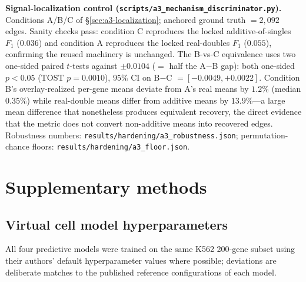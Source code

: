 \documentclass{article}
\theoremstyle{plain}
\theoremstyle{definition}
\theoremstyle{remark}
\begin{document}
\textbf{Signal-localization control (\texttt{scripts/a3\_mechanism\_discriminator.py}).} Conditions A/B/C of \S\ref{sec:a3-localization}; anchored ground truth $= 2{,}092$ edges. Sanity checks pass: condition C reproduces the locked additive-of-singles $F_1$ ($0.036$) and condition A reproduces the locked real-doubles $F_1$ ($0.055$), confirming the reused machinery is unchanged. The B-vs-C equivalence uses two one-sided paired $t$-tests against $\pm 0.0104$ ($=$ half the A$-$B gap): both one-sided $p < 0.05$ (TOST $p = 0.0010$), $95\%$ CI on B$-$C $= [-0.0049, +0.0022]$. Condition B's overlay-realized per-gene means deviate from A's real means by $1.2\%$ (median $0.35\%$) while real-double means differ from additive means by $13.9\%$---a large mean difference that nonetheless produces equivalent recovery, the direct evidence that the metric does not convert non-additive means into recovered edges. Robustness numbers: \texttt{results/hardening/a3\_robustness.json}; permutation-chance floors: \texttt{results/hardening/a3\_floor.json}.

\section{Supplementary methods}
\label{app:supp_methods}

\subsection{Virtual cell model hyperparameters}
\label{app:hparams}

All four predictive models were trained on the same K562 200-gene subset using their authors' default hyperparameter values where possible; deviations are deliberate matches to the published reference configurations of each model.
\end{document}

